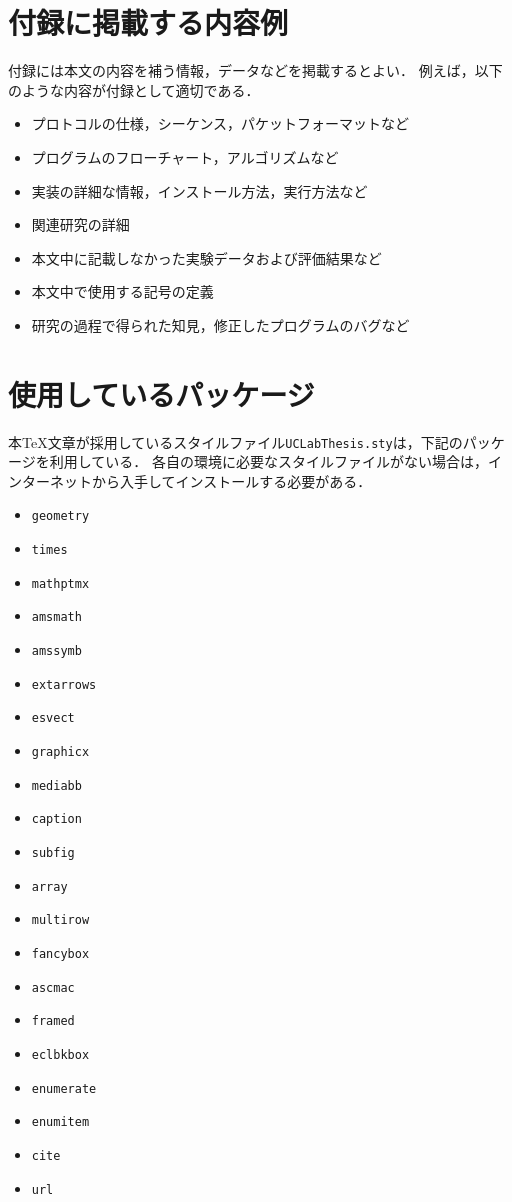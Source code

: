 
\chapter{付録に掲載する内容例}\label{apdx:Example}

付録には本文の内容を補う情報，データなどを掲載するとよい．
例えば，以下のような内容が付録として適切である．

\begin{itemize}
\item プロトコルの仕様，シーケンス，パケットフォーマットなど
\item プログラムのフローチャート，アルゴリズムなど
\item 実装の詳細な情報，インストール方法，実行方法など
\item 関連研究の詳細
\item 本文中に記載しなかった実験データおよび評価結果など
\item 本文中で使用する記号の定義
\item 研究の過程で得られた知見，修正したプログラムのバグなど
\end{itemize}


\chapter{使用しているパッケージ}\label{apdx:package}

本{\TeX}文章が採用しているスタイルファイル\texttt{UCLabThesis.sty}は，下記のパッケージを利用している．
各自の環境に必要なスタイルファイルがない場合は，インターネットから入手してインストールする必要がある．

\begin{itemize}
\item \texttt{geometry}
\item \texttt{times}
\item \texttt{mathptmx}
\item \texttt{amsmath}
\item \texttt{amssymb}
\item \texttt{extarrows}
\item \texttt{esvect}
\item \texttt{graphicx}
\item \texttt{mediabb}
\item \texttt{caption}
\item \texttt{subfig}
\item \texttt{array}
\item \texttt{multirow}
\item \texttt{fancybox}
\item \texttt{ascmac}
\item \texttt{framed}
\item \texttt{eclbkbox}
\item \texttt{enumerate}
\item \texttt{enumitem}
\item \texttt{cite}
\item \texttt{url}
\end{itemize}

\endinput